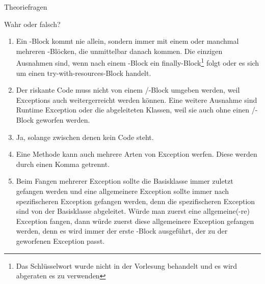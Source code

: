 \documentclass{../tuda-exercise}
\begin{document}
\begin{task}[credit=\stars{0}{3}]{Theoriefragen}
\begin{subtask*}{Wahr oder falsch?}
      \begin{solution}
        \begin{enumerate}
          [label=(\Alph*)]
          \item Ein -Block kommt nie allein, sondern immer mit einem oder
          manchmal mehreren -Blöcken, die unmittelbar danach kommen. Die
          einzigen Ausnahmen sind, wenn nach einem -Block ein
          \textcolor{keywordcolor}{finally}-Block\footnote{Das Schlüsselwort wurde nicht in der
          Vorlesung behandelt und es wird abgeraten es zu verwenden} folgt oder es sich um einen
          \textcolor{keywordcolor}{try-with-resources}-Block handelt.
          \item Der riskante Code muss nicht von einem /-Block
          umgeben werden, weil Exceptions auch weitergerreicht werden können. Eine weitere
          Ausnahme sind Runtime Exception oder die abgeleiteten Klassen, weil sie auch ohne einen
          /-Block geworfen werden.
          \item Ja, solange zwischen denen kein Code steht.
          \item Eine Methode kann auch mehrere Arten von Exception werfen. Diese werden durch
          einen Komma getrennt.
          \item Beim Fangen mehrerer Exception sollte die Basisklasse immer zuletzt gefangen
          werden und eine allgemeinere Exception sollte immer nach spezifischeren Exception
          gefangen werden, denn die spezifischeren Exception sind von der Basisklasse abgeleitet.
          Würde man zuerst eine allgemeine(-re) Exception fangen, dann würde zuerst diese
          allgemeinere Exception gefangen werden, denn es wird immer der erste
          -Block ausgeführt, der zu der geworfenen Exception passt.

          \br


\end{enumerate}
\end{solution}
\end{subtask*}
\end{task}
\end{document}
